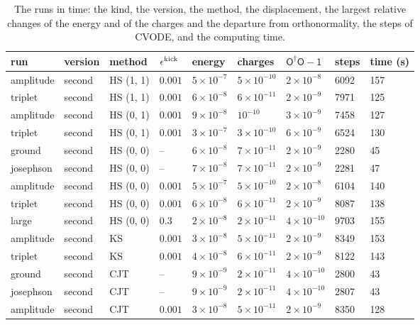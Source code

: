 \documentclass[aps,prd,onecolumn,superscriptaddress,nofootinbib,floatfix,longbibliography]{revtex4-2}
\begin{document}
\begin{table}[!htbp]
\caption{\label{tab:runs}The runs in time: the kind, the version, the method, the displacement, the largest relative changes of the energy and of the charges and the departure from orthonormality, the steps of CVODE, and the computing time.}
\begingroup\centering\footnotesize\setlength{\tabcolsep}{4pt}
\begin{tabular}{lllllllll}
\hline\hline
run & version & method & $\epsilon^{\rm kick}$ & energy & charges & $\mathsf O^\dagger\mathsf O-\mathsf 1$ & steps & time (s) \\ \hline
amplitude & second & HS (1, 1) & $0.001$ & $5\times10^{-7}$ & $5\times10^{-10}$ & $2\times10^{-8}$ & 6092 & 157 \\
triplet & second & HS (1, 1) & $0.001$ & $6\times10^{-8}$ & $6\times10^{-11}$ & $2\times10^{-9}$ & 7971 & 125 \\
amplitude & second & HS (0, 1) & $0.001$ & $9\times10^{-8}$ & $10^{-10}$ & $3\times10^{-9}$ & 7458 & 127 \\
triplet & second & HS (0, 1) & $0.001$ & $3\times10^{-7}$ & $3\times10^{-10}$ & $6\times10^{-9}$ & 6524 & 130 \\
ground & second & HS (0, 0) & -- & $6\times10^{-8}$ & $7\times10^{-11}$ & $2\times10^{-9}$ & 2280 & 45 \\
josephson & second & HS (0, 0) & -- & $7\times10^{-8}$ & $7\times10^{-11}$ & $2\times10^{-9}$ & 2281 & 47 \\
amplitude & second & HS (0, 0) & $0.001$ & $5\times10^{-7}$ & $5\times10^{-10}$ & $2\times10^{-8}$ & 6104 & 140 \\
triplet & second & HS (0, 0) & $0.001$ & $6\times10^{-8}$ & $6\times10^{-11}$ & $2\times10^{-9}$ & 8087 & 138 \\
large & second & HS (0, 0) & $0.3$ & $2\times10^{-8}$ & $2\times10^{-11}$ & $4\times10^{-10}$ & 9703 & 155 \\
amplitude & second & KS & $0.001$ & $3\times10^{-8}$ & $5\times10^{-11}$ & $2\times10^{-9}$ & 8349 & 153 \\
triplet & second & KS & $0.001$ & $4\times10^{-8}$ & $6\times10^{-11}$ & $2\times10^{-9}$ & 8122 & 143 \\
ground & second & CJT & -- & $9\times10^{-9}$ & $2\times10^{-11}$ & $4\times10^{-10}$ & 2800 & 43 \\
josephson & second & CJT & -- & $9\times10^{-9}$ & $2\times10^{-11}$ & $4\times10^{-10}$ & 2807 & 43 \\
amplitude & second & CJT & $0.001$ & $3\times10^{-8}$ & $5\times10^{-11}$ & $2\times10^{-9}$ & 8350 & 128 \\

\end{tabular}
\end{table}
\end{document}
